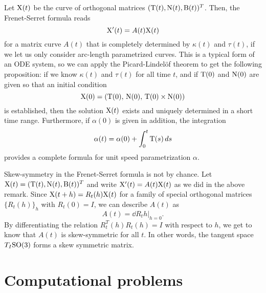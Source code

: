 \documentclass{../note}
\def\a{\alpha}
\begin{document}
\begin{rmk}
Let $\mathrm{X}(t)$ be the curve of orthogonal matrices $(\mathrm{T}(t),\mathrm{N}(t),\mathrm{B}(t))^T$.
Then, the Frenet-Serret formula reads
\[\mathrm{X}'(t)=A(t)\mathrm{X}(t)\]
for a matrix curve $A(t)$ that is completely determined by $\kappa(t)$ and $\tau(t)$, if we let us only consider arc-length parametrized curves.
This is a typical form of an ODE system, so we can apply the Picard-Lindel\"of theorem to get the following proposition: if we know $\kappa(t)$ and $\tau(t)$ for all time $t$, and if $\mathrm{T}(0)$ and $\mathrm{N}(0)$ are given so that an initial condition
\[\mathrm{X}(0)=(\mathrm{T}(0),\,\mathrm{N}(0),\,\mathrm{T}(0)\times\mathrm{N}(0))\]
is established, then the solution $\mathrm{X}(t)$ exists and uniquely determined in a short time range.
Furthermore, if $\a(0)$ is given in addition, the integration
\[\a(t)=\a(0)+\int_0^t\rT(s)\,ds\]
provides a complete formula for unit speed parametrization $\a$.
\end{rmk}
\begin{rmk}
Skew-symmetry in the Frenet-Serret formula is not by chance.
Let $\mathrm{X}(t)=(\mathrm{T}(t),\mathrm{N}(t),\mathrm{B}(t))^T$ and write $\mathrm{X}'(t)=A(t)\mathrm{X}(t)$ as we did in the above remark.
Since $\mathrm{X}(t+h)=R_t(h)\mathrm{X}(t)$ for a family of special orthogonal matrices $\{R_t(h)\}_h$ with $R_t(0)=I$, we can describe $A(t)$ as 
\[A(t)=\left.\dd{R_t}{h}\right\rvert_{h=0}.\]
By differentiating the relation $R_t^T(h)R_t(h)=I$ with respect to $h$, we get to know that $A(t)$ is skew-symmetric for all $t$.
In other words, the tangent space $T_I\mathrm{SO}(3)$ forms a skew symmetric matrix.
\end{rmk}













\section{Computational problems}
\end{document}
